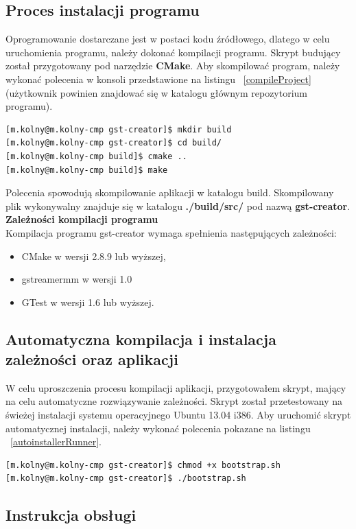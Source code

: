 \documentclass[12pt]{article}
\begin{document}
\subsection{Proces instalacji programu}
Oprogramowanie dostarczane jest w postaci kodu źródłowego, dlatego w celu uruchomienia programu, należy dokonać kompilacji programu. Skrypt budujący został przygotowany pod narzędzie \textbf{CMake}. Aby skompilować program, należy wykonać polecenia w konsoli przedstawione na listingu ~\ref{compileProject} (użytkownik powinien znajdować się w katalogu głównym repozytorium programu).
\begin{lstlisting}[caption=Polecenia kompilujące program gst-creator, label=compileProject]
[m.kolny@m.kolny-cmp gst-creator]$ mkdir build
[m.kolny@m.kolny-cmp gst-creator]$ cd build/
[m.kolny@m.kolny-cmp build]$ cmake ..
[m.kolny@m.kolny-cmp build]$ make
\end{lstlisting}
Polecenia spowodują skompilowanie aplikacji w katalogu build. Skompilowany plik wykonywalny znajduje się w katalogu \textbf{./build/src/} pod nazwą \textbf{gst-creator}. \\
\textbf{Zależności kompilacji programu} \\
Kompilacja programu gst-creator wymaga spełnienia następujących zależności:
\begin{itemize}
  \setlength{\itemsep}{0em}
\item CMake w wersji 2.8.9 lub wyższej,
\item gstreamermm w wersji 1.0
\item GTest w wersji 1.6 lub wyższej.
\end{itemize}
\subsection{Automatyczna kompilacja i instalacja zależności oraz aplikacji}
W celu uproszczenia procesu kompilacji aplikacji, przygotowałem skrypt, mający na celu automatyczne rozwiązywanie zależności. Skrypt został przetestowany na świeżej instalacji systemu operacyjnego Ubuntu 13.04 i386. Aby uruchomić skrypt automatycznej instalacji, należy wykonać polecenia pokazane na listingu ~\ref{autoinstallerRunner}.
\begin{lstlisting}[caption=Uruchomienie skryptu autoinstalatora, label=autoinstallerRunner]
[m.kolny@m.kolny-cmp gst-creator]$ chmod +x bootstrap.sh
[m.kolny@m.kolny-cmp gst-creator]$ ./bootstrap.sh
\end{lstlisting}
\subsection{Instrukcja obsługi}
\end{document}
